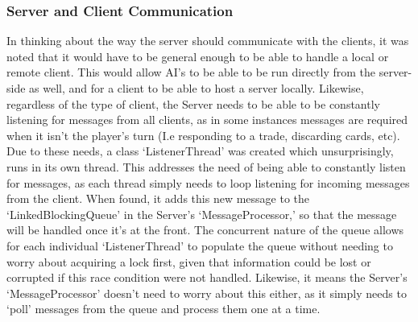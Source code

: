 \documentclass[a4paper,doc,draftfirst]{apa6}
\begin{document}
\subsubsection{Server and Client Communication}
In thinking about the way the server should communicate with the clients, it was noted that it would have to be general enough to be able to handle a local or remote client. This would allow AI’s to be able to be run directly from the server-side as well, and for a client to be able to host a server locally. Likewise, regardless of the type of client, the Server needs to be able to be constantly listening for messages from all clients, as in some instances messages are required when it isn’t the player’s turn (I.e responding to a trade, discarding cards, etc). Due to these needs, a class ‘ListenerThread’ was created which unsurprisingly, runs in its own thread. This addresses the need of being able to constantly listen for messages, as each thread simply needs to loop listening for incoming messages from the client. When found, it adds this new message to the ‘LinkedBlockingQueue’ in the Server’s ‘MessageProcessor,’ so that the message will be handled once it’s at the front. The concurrent nature of the queue allows for each individual ‘ListenerThread’ to populate the queue without needing to worry about acquiring a lock first, given that information could be lost or corrupted if this race condition were not handled. Likewise, it means the Server’s ‘MessageProcessor’ doesn’t need to worry about this either, as it simply needs to ‘poll’ messages from the queue and process them one at a time.
\end{document}
